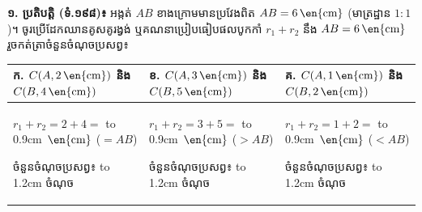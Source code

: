 \documentclass[a4paper,10pt]{article}
\newcommand{\unit}[1]{\,\text{\en{#1}}}
\newcommand{\blank}[1]{\leavevmode\hbox to #1{\dotfill}}
\begin{document}
\begin{tcolorbox}[
  enhanced, sharp corners, colback=white, colframe=black,
  boxrule=0.95pt, boxsep=2pt, top=4pt, bottom=4pt, left=6pt, right=6pt, after skip=4.5pt
]
  \textbf{១. ប្រតិបត្តិ (ទំ.១៩៨)៖} អង្កត់ $AB$ ខាងក្រោមមានប្រវែងពិត $AB = 6\unit{cm}$ (មាត្រដ្ឋាន $1:1$)។ ចូរប្រើដែកឈានគូសគូរង្វង់ ឬគណនាប្រៀបធៀបផលបូកកាំ $r_1 + r_2$ នឹង $AB = 6\unit{cm}$ រួចកត់ត្រាចំនួនចំណុចប្រសព្វ៖
  \begin{center}
    \vspace{-2pt}
    \vspace{-3pt}
  \end{center}
  \renewcommand{\arraystretch}{1.22}
  \begin{tabular}{|p{5.8cm}|p{5.8cm}|p{5.8cm}|}
    \hline
    \cellcolor{headgray}\centering\textbf{ក. $C(A, 2\unit{cm})$ និង $C(B, 4\unit{cm})$} &
    \cellcolor{headgray}\centering\textbf{ខ. $C(A, 3\unit{cm})$ និង $C(B, 5\unit{cm})$} &
    \cellcolor{headgray}\centering\arraybackslash\textbf{គ. $C(A, 1\unit{cm})$ និង $C(B, 2\unit{cm})$} \\[2pt]
    \hline
    $r_1 + r_2 = 2 + 4 =$ \blank{0.9cm} $\unit{cm}$ ($= AB$)\par
    ចំនួនចំណុចប្រសព្វ៖ \blank{1.2cm} ចំណុច &
    $r_1 + r_2 = 3 + 5 =$ \blank{0.9cm} $\unit{cm}$ ($> AB$)\par
    ចំនួនចំណុចប្រសព្វ៖ \blank{1.2cm} ចំណុច &
    \arraybackslash $r_1 + r_2 = 1 + 2 =$ \blank{0.9cm} $\unit{cm}$ ($< AB$)\par
    ចំនួនចំណុចប្រសព្វ៖ \blank{1.2cm} ចំណុច \\[3pt]
    \hline
  \end{tabular}
\end{tcolorbox}
\end{document}
